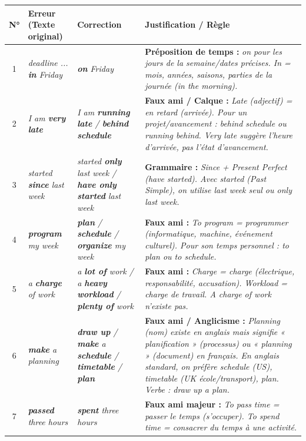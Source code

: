 \documentclass[11pt]{article}
\newcommand{\eng}[1]{\ifmmode\text{\textit{#1}}\else\begingroup\selectlanguage{english}\itshape #1\endgroup\fi}
\begin{document}
\begin{exoresolu}
\begin{center}
\begin{tabularx}{\linewidth}{|c|X|X|X|}\hline
\rowcolor{popblueL} \textbf{N°} & \textbf{Erreur (Texte original)} & \textbf{Correction} & \textbf{Justification / Règle} \\ \hline
1 & \eng{deadline ... \textbf{in} Friday} & \eng{\textbf{on} Friday} & \textbf{Préposition de temps :} \eng{on} pour les jours de la semaine/dates précises. \eng{In} = mois, années, saisons, parties de la journée (\eng{in the morning}). \\ \hline
2 & \eng{I am \textbf{very late}} & \eng{I am \textbf{running late} / \textbf{behind schedule}} & \textbf{Faux ami / Calque :} \eng{Late} (adjectif) = en retard (arrivée). Pour un projet/avancement : \eng{behind schedule} ou \eng{running behind}. \eng{Very late} suggère l'heure d'arrivée, pas l'état d'avancement. \\ \hline
3 & \eng{started \textbf{since} last week} & \eng{started \textbf{only} last week / \textbf{have only started} last week} & \textbf{Grammaire :} \eng{Since} + Present Perfect (\eng{have started}). Avec \eng{started} (Past Simple), on utilise \eng{last week} seul ou \eng{only last week}. \\ \hline
4 & \eng{\textbf{program} my week} & \eng{\textbf{plan} / \textbf{schedule} / \textbf{organize} my week} & \textbf{Faux ami :} \eng{To program} = programmer (informatique, machine, événement culturel). Pour son temps personnel : \eng{to plan} ou \eng{to schedule}. \\ \hline
5 & \eng{a \textbf{charge} of work} & \eng{a \textbf{lot of} work / a \textbf{heavy workload} / \textbf{plenty of} work} & \textbf{Faux ami :} \eng{Charge} = charge (électrique, responsabilité, accusation). \eng{Workload} = charge de travail. \eng{A charge of work} n'existe pas. \\ \hline
6 & \eng{\textbf{make} a planning} & \eng{\textbf{draw up} / \textbf{make} a \textbf{schedule} / \textbf{timetable} / \textbf{plan}} & \textbf{Faux ami / Anglicisme :} \eng{Planning} (nom) existe en anglais mais signifie « planification » (processus) ou « planning » (document) en français. En anglais standard, on préfère \eng{schedule} (US), \eng{timetable} (UK école/transport), \eng{plan}. Verbe : \eng{draw up a plan}. \\ \hline
7 & \eng{\textbf{passed} three hours} & \eng{\textbf{spent} three hours} & \textbf{Faux ami majeur :} \eng{To pass time} = passer le temps (s'occuper). \eng{To spend time} = consacrer du temps à une activité. \\ \hline

\end{tabularx}
\end{center}
\end{exoresolu}
\end{document}

